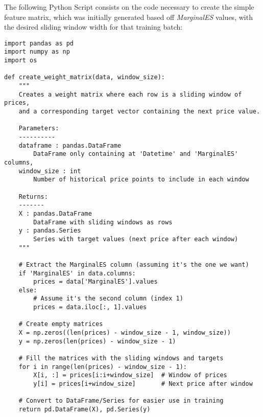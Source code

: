 \documentclass[12pt]{report} %
\begin{document}
The following Python Script consists on the code necessary to create the simple feature matrix, which was initially generated based off \textit{MarginalES} values, with the desired sliding window width for that training batch:
\begin{lstlisting}
import pandas as pd
import numpy as np
import os

def create_weight_matrix(data, window_size):
    """
    Creates a weight matrix where each row is a sliding window of prices,
    and a corresponding target vector containing the next price value.
    
    Parameters:
    ----------
    dataframe : pandas.DataFrame
        DataFrame only containing at 'Datetime' and 'MarginalES' columns, 
    window_size : int
        Number of historical price points to include in each window
    
    Returns:
    -------
    X : pandas.DataFrame
        DataFrame with sliding windows as rows
    y : pandas.Series
        Series with target values (next price after each window)
    """
    
    # Extract the MarginalES column (assuming it's the one we want)
    if 'MarginalES' in data.columns:
        prices = data['MarginalES'].values
    else:
        # Assume it's the second column (index 1)
        prices = data.iloc[:, 1].values
    
    # Create empty matrices
    X = np.zeros((len(prices) - window_size - 1, window_size))
    y = np.zeros(len(prices) - window_size - 1)
    
    # Fill the matrices with the sliding windows and targets
    for i in range(len(prices) - window_size - 1):
        X[i, :] = prices[i:i+window_size]  # Window of prices
        y[i] = prices[i+window_size]       # Next price after window
    
    # Convert to DataFrame/Series for easier use in training
    return pd.DataFrame(X), pd.Series(y)
\end{lstlisting}
\end{document}
